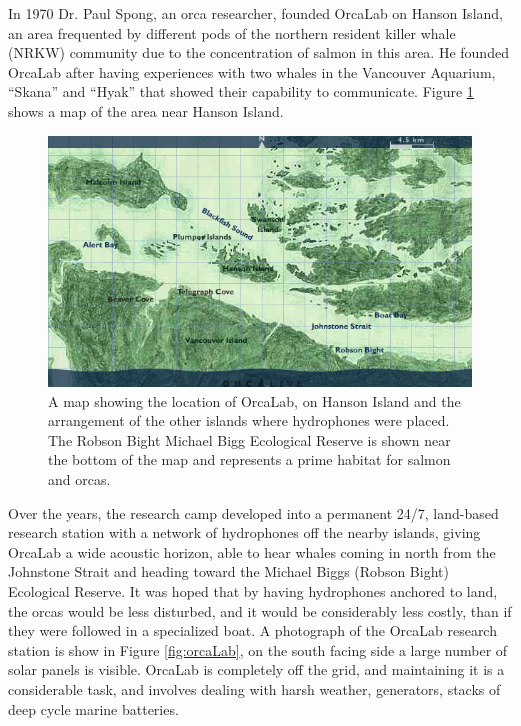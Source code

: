 In 1970 Dr. Paul Spong, an orca researcher, founded OrcaLab on Hanson
Island, an area frequented by different pods of the northern resident
killer whale (NRKW) community due to the concentration of salmon in
this area.  He founded OrcaLab after having experiences with two
whales in the Vancouver Aquarium, ``Skana'' and ``Hyak'' that showed
their capability to communicate. Figure \ref{fig:orcalabMap} shows a
map of the area near Hanson Island.

\begin{figure}[t]
\centering
\includegraphics[width=\columnwidth]{figures/orcalabMap}
\caption{A map showing the location of OrcaLab, on Hanson Island and
  the arrangement of the other islands where hydrophones were placed.
  The Robson Bight Michael Bigg Ecological Reserve is shown near the
  bottom of the map and represents a prime habitat for salmon and
  orcas.}
\label{fig:orcalabMap}
\end{figure}

Over the years, the research camp developed into a permanent 24/7,
land-based research station with a network of hydrophones off the
nearby islands, giving OrcaLab a wide acoustic horizon, able to hear
whales coming in north from the Johnstone Strait and heading toward
the Michael Biggs (Robson Bight) Ecological Reserve.  It was hoped
that by having hydrophones anchored to land, the orcas would be less
disturbed, and it would be considerably less costly, than if they were
followed in a specialized boat.  A photograph of the OrcaLab research
station is show in Figure \ref{fig:orcaLab}, on the south facing side
a large number of solar panels is visible.  OrcaLab is completely off
the grid, and maintaining it is a considerable task, and involves
dealing with harsh weather, generators, stacks of deep cycle marine
batteries.

